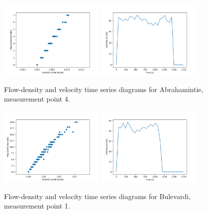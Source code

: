 \documentclass[english, 12pt, a4paper, elec, utf8, pdfa, online]{aaltothesis}
\begin{document}
\clearpage
\begin{figure}[ht!]
    \centering
    \includegraphics[width=0.45\textwidth]{graphs/Abrahamintie_4_flw_dns.png}
    \includegraphics[width=0.45\textwidth]{graphs/Abrahamintie_4_spd_time_6.png}
    \caption{Flow-density and velocity time series diagrams for Abrahamintie, measurement point 4.}
\end{figure}
\begin{figure}[ht!]
    \centering
    \includegraphics[width=0.45\textwidth]{graphs/Bulevardi_1_flw_dns.png}
    \includegraphics[width=0.45\textwidth]{graphs/Bulevardi_1_spd_time_6.png}
    \caption{Flow-density and velocity time series diagrams for Bulevardi, measurement point 1.}
\end{figure}
\end{document}
